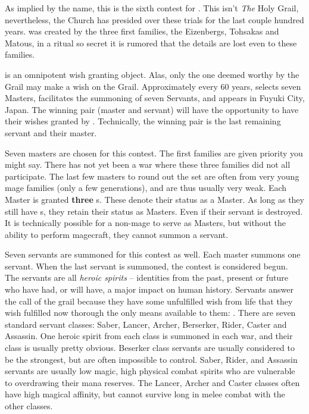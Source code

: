 \documentclass[blue]{FateDarkDawn}
\begin{document}
\name{\bHGW{}}


As implied by the name, this is the sixth contest for \iGrail{\MYname{}}. This isn't \emph{The} Holy Grail, nevertheless, the Church has presided over these trials for the last couple hundred years. \iGrail{\MYname{}} was created by the three first families, the Eizenbergs, Tohsakas and Matous, in a ritual so secret it is rumored that the details are lost even to these families.

\iGrail{\MYname{}} is an omnipotent wish granting object. Alas, only the one deemed worthy by the Grail may make a wish on the Grail. Approximately every 60 years, \iGrail{\MYname{}} selects seven Masters, facilitates the summoning of seven Servants, and appears in Fuyuki City, Japan. The winning pair (master and servant) will have the opportunity to have their wishes granted by \iGrail{\MYname{}}. Technically, the winning pair is the last remaining servant and their master.

Seven masters are chosen for this contest. The first families are given priority you might say. There has not yet been a war where these three families did not all participate. The last few masters to round out the set are often from very young mage families (only a few generations), and are thus usually very weak. Each Master is granted {\bf three} \iCommand{\MYname}s. These denote their status as a Master. As long as they still have \iCommand{\MYname}s, they retain their status as Masters. Even if their servant is destroyed. It is technically possible for a non-mage to serve as Masters, but without the ability to perform magecraft, they cannot summon a servant.

Seven servants are summoned for this contest as well. Each master summons one servant. When the last servant is summoned, the contest is considered begun. The servants are all \emph{heroic spirits} -- identities from the past, present or future who have had, or will have, a major impact on human history. Servants answer the call of the grail because they have some unfulfilled wish from life that they wish fulfilled now thorough the only means available to them: \iGrail{\MYname{}}. There are seven standard servant classes: Saber, Lancer, Archer, Berserker, Rider, Caster and Assassin. One heroic spirit from each class is summoned in each war, and their class is usually pretty obvious. Beserker class servants are usually considered to be the strongest, but are often impossible to control. Saber, Rider, and Assassin servants are usually low magic, high physical combat spirits who are vulnerable to overdrawing their mana reserves. The Lancer, Archer and Caster classes often have high magical affinity, but cannot survive long in melee combat with the other classes.
\end{document}

